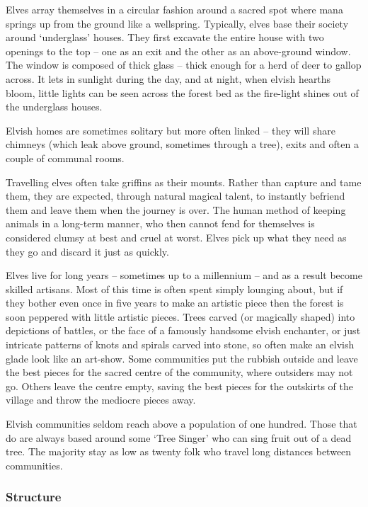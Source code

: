 \begin{multicols}{2}
\renewcommand\npcsymbol{\El}

\noindent
Elves array themselves in a circular fashion around a sacred spot where mana springs up from the ground like a wellspring.
Typically, elves base their society around `underglass' houses.
They first excavate the entire house with two openings to the top -- one as an exit and the other as an above-ground window.
The window is composed of thick glass -- thick enough for a herd of deer to gallop across.
It lets in sunlight during the day, and at night, when elvish hearths bloom, little lights can be seen across the forest bed as the fire-light shines out of the underglass houses.

Elvish homes are sometimes solitary but more often linked -- they will share chimneys (which leak above ground, sometimes through a tree), exits and often a couple of communal rooms.

Travelling elves often take griffins as their mounts. Rather than capture and tame them, they are expected, through natural magical talent, to instantly befriend them and leave them when the journey is over. The human method of keeping animals in a long-term manner, who then cannot fend for themselves is considered clumsy at best and cruel at worst. Elves pick up what they need as they go and discard it just as quickly.

Elves live for long years -- sometimes up to a millennium -- and as a result become skilled artisans.
Most of this time is often spent simply lounging about, but if they bother even once in five years to make an artistic piece then the forest is soon peppered with little artistic pieces.
Trees carved (or magically shaped) into depictions of battles, or the face of a famously handsome elvish enchanter, or just intricate patterns of knots and spirals carved into stone, so often make an elvish glade look like an art-show.
Some communities put the rubbish outside and leave the best pieces for the sacred centre of the community, where outsiders may not go.
Others leave the centre empty, saving the best pieces for the outskirts of the village and throw the mediocre pieces away.

Elvish communities seldom reach above a population of one hundred.
Those that do are always based around some `Tree Singer' who can sing fruit out of a dead tree.
The majority stay as low as twenty folk who travel long distances between communities.

\subsubsection{Structure}


\end{multicols}
